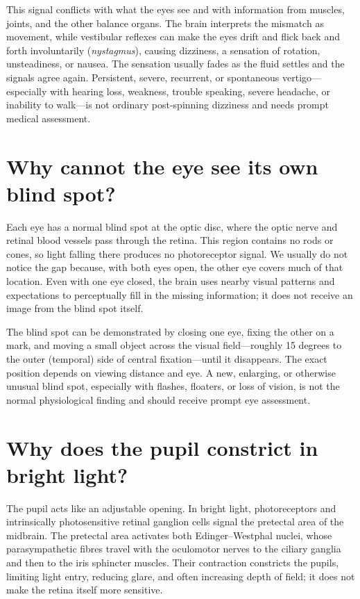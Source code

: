 \documentclass[11pt,oneside]{report}
\begin{document}
This signal conflicts with what the eyes see and with information from muscles,
joints, and the other balance organs. The brain interprets the mismatch as
movement, while vestibular reflexes can make the eyes drift and flick back and
forth involuntarily (\emph{nystagmus}), causing dizziness, a sensation of
rotation, unsteadiness, or nausea. The sensation
usually fades as the fluid settles and the signals agree again. Persistent,
severe, recurrent, or spontaneous vertigo---especially with hearing loss,
weakness, trouble speaking, severe headache, or inability to walk---is not
ordinary post-spinning dizziness and needs prompt medical assessment.

\section{Why cannot the eye see its own blind spot?}

Each eye has a normal blind spot at the optic disc, where the optic nerve and
retinal blood vessels pass through the retina. This region contains no rods or
cones, so light falling there produces no photoreceptor signal. We usually do
not notice the gap because, with both eyes open, the other eye covers much of
that location. Even with one eye closed, the brain uses nearby visual patterns
and expectations to perceptually fill in the missing information; it does not
receive an image from the blind spot itself.

The blind spot can be demonstrated by closing one eye, fixing the other on a
mark, and moving a small object across the visual field—roughly 15 degrees to
the outer (temporal) side of central fixation—until it disappears. The exact position depends on viewing distance and eye.
A new, enlarging, or otherwise unusual blind spot, especially with flashes,
floaters, or loss of vision, is not the normal physiological finding and should
receive prompt eye assessment.

\section{Why does the pupil constrict in bright light?}

The pupil acts like an adjustable opening. In bright light, photoreceptors and
intrinsically photosensitive retinal ganglion cells signal the pretectal area of
the midbrain. The pretectal area activates both Edinger--Westphal nuclei, whose parasympathetic
fibres travel with the oculomotor nerves to the ciliary ganglia and then to the
iris sphincter muscles. Their contraction constricts the pupils, limiting light
entry, reducing glare, and often increasing depth of field; it does not make
the retina itself more sensitive.
\end{document}
